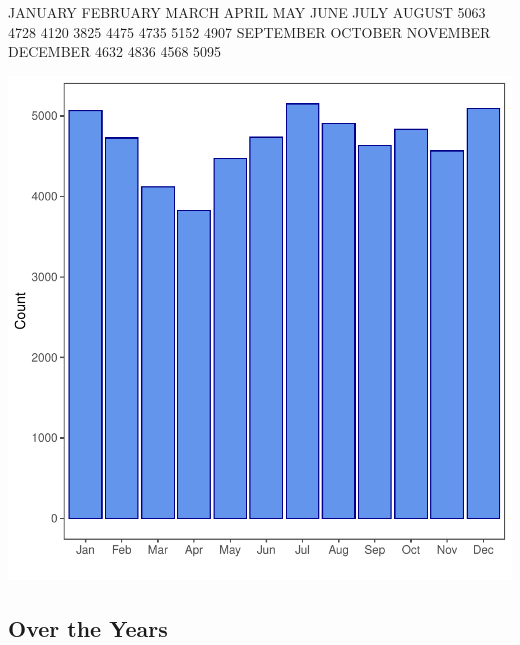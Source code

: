 \documentclass[11pt, a4paper]{article}
\begin{document}
\begin{Schunk}
\begin{Soutput}
  JANUARY  FEBRUARY     MARCH     APRIL       MAY      JUNE      JULY    AUGUST 
     5063      4728      4120      3825      4475      4735      5152      4907 
SEPTEMBER   OCTOBER  NOVEMBER  DECEMBER 
     4632      4836      4568      5095 
\end{Soutput}
\end{Schunk}
\includegraphics{variableinvestigation-005}


\pagebreak
\subsection{Over the Years}
\end{document}
